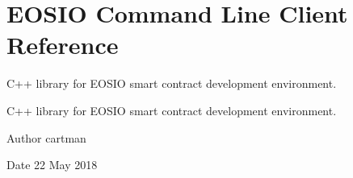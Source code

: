 \hypertarget{group__teoslib}{}\section{E\+O\+S\+IO Command Line Client Reference}
\label{group__teoslib}


C++ library for E\+O\+S\+IO smart contract development environment.  


C++ library for E\+O\+S\+IO smart contract development environment. 

\begin{DoxyAuthor}{Author}
cartman 
\end{DoxyAuthor}
\begin{DoxyDate}{Date}
22 May 2018 
\end{DoxyDate}
